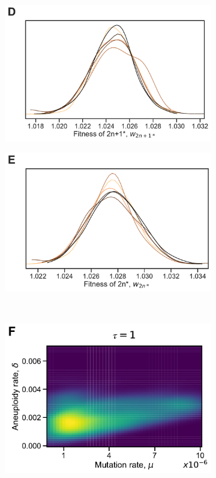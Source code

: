 \documentclass[12pt]{extarticle}
\begin{document}
\begin{figure}[h!]
\begin{subfigure}{0.325\textwidth}
  \end{subfigure}
    \begin{subfigure}{0.325\textwidth}
      \includegraphics[width=\textwidth]{../figures/tau-D.pdf}      
  \end{subfigure}
    \begin{subfigure}{0.325\textwidth}
      \includegraphics[width=\textwidth]{../figures/tau-E.pdf}      
  \end{subfigure}
  \\
  \begin{subfigure}{0.325\textwidth}
      \includegraphics[width=\textwidth]{../figures/tau-joint-F.pdf}      

\end{subfigure}
\end{figure}
\end{document}

